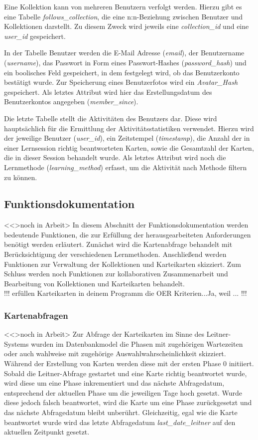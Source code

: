Eine Kollektion kann von mehreren Benutzern verfolgt werden. Hierzu gibt es eine Tabelle \emph{follows{\_}collection}, die eine n:n-Beziehung zwischen Benutzer und Kollektionen darstellt. Zu diesem Zweck wird jeweils eine \emph{collection{\_}id} und eine \emph{user{\_}id} gespeichert. 

In der Tabelle Benutzer werden die E-Mail Adresse (\emph{email}), der Benutzername (\emph{username}), das Passwort in Form eines Passwort-Hashes (\emph{password{\_}hash}) und ein boolisches Feld gespeichert, in dem festgelegt wird, ob das Benutzerkonto bestätigt wurde. Zur Speicherung eines Benutzerfotos wird ein \emph{Avatar{\_}Hash} gespeichert. Als letztes Attribut wird hier das Erstellungsdatum des Benutzerkontos angegeben (\emph{member{\_}since}).

Die letzte Tabelle stellt die Aktivitäten des Benutzers dar. Diese wird hauptsächlich für die Ermittlung der Aktivitätsstatistiken verwendet. Hierzu wird der jeweilige Benutzer (\emph{user{\_}id}), ein Zeitstempel (\emph{timestamp}), die Anzahl der in einer Lernsession richtig beantworteten Karten, sowie die Gesamtzahl der Karten, die in dieser Session behandelt wurde. Als letztes Attribut wird noch die Lernmethode (\emph{learning{\_}method}) erfasst, um die Aktivität nach Methode filtern zu können.




\subsection{Funktionsdokumentation}
<<>noch in Arbeit>
In diesem Abschnitt der Funktionsdokumentation werden bedeutende Funktionen, die zur Erfüllung der herausgearbeiteten Anforderungen benötigt werden erläutert. Zunächst wird die Kartenabfrage behandelt mit Berücksichtigung der verschiedenen Lernmethoden. Anschließend werden Funktionen zur Verwaltung der Kollektionen und Karteikarten skizziert. Zum Schluss werden noch Funktionen zur kollaborativen Zusammenarbeit und Bearbeitung von Kollektionen und Karteikarten behandelt. \\

!!! erfüllen Karteikarten in deinem Programm die OER Kriterien...Ja, weil ... !!!

\subsubsection{Kartenabfragen}
<<>noch in Arbeit>
Zur Abfrage der Karteikarten im Sinne des Leitner-Systems wurden im Datenbankmodel die Phasen mit zugehörigen Wartezeiten oder auch wahlweise mit zugehörige Auswahlwahrscheinlichkeit skizziert. Während der Erstellung von Karten werden diese mit der ersten Phase 0 initiiert. Sobald die Leitner-Abfrage gestartet und eine Karte richtig beantwortet wurde, wird diese um eine Phase inkrementiert und das nächste Abfragedatum, entsprechend der aktuellen Phase um die jeweiligen Tage hoch gesetzt. Wurde diese jedoch falsch beantwortet, wird die Karte um eine Phase zurückgesetzt und das nächste Abfragedatum bleibt unberührt. Gleichzeitig, egal wie die Karte beantwortet wurde wird das letzte Abfragedatum \emph{last{\_}date{\_}leitner} auf den aktuellen Zeitpunkt gesetzt. \\

